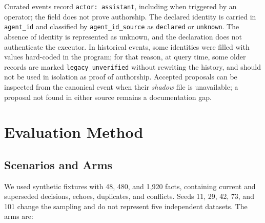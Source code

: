 \documentclass[11pt,a4paper]{article}
\begin{document}
Curated events record \texttt{actor: assistant}, including when triggered by an operator; the field does not prove authorship. The declared identity is carried in \texttt{agent\_id} and classified by \texttt{agent\_\allowbreak{}id\_\allowbreak{}source} as \texttt{declared} or \texttt{unknown}. The absence of identity is represented as unknown, and the declaration does not authenticate the executor. In historical events, some identities were filled with values hard-coded in the program; for that reason, at query time, some older records are marked \texttt{legacy\_\allowbreak{}unverified} without rewriting the history, and should not be used in isolation as proof of authorship. Accepted proposals can be inspected from the canonical event when their \emph{shadow} file is unavailable; a proposal not found in either source remains a documentation gap.

\section{Evaluation Method}\label{sec:4}
\subsection{Scenarios and Arms}\label{sec:4.1}
We used synthetic fixtures with 48, 480, and 1,920 facts, containing current and superseded decisions, echoes, duplicates, and conflicts. Seeds 11, 29, 42, 73, and 101 change the sampling and do not represent five independent datasets. The arms are:
\end{document}
